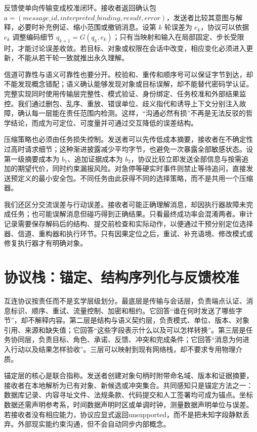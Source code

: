 反馈使单向传输变成校准闭环。接收者返回确认包 $a=(message\_id,interpreted\_binding,result,error)$，发送者比较其意图与解释，必要时补充例证、缩小范围或撤销消息。设第 $k$ 轮误差为 $e_k$，协议可以依据 $e_k$ 调整编码细节 $q_{k+1}=G(q_k,e_k)$；只有当映射和输入在局部固定、步长受限时，才能讨论误差收敛。若目标、对象或权限在会话中改变，相应变化必须进入更新，不能从若干轮一致就推出永久理解。

信道可靠性与语义可靠性也要分开。校验和、重传和顺序号可以保证字节到达，却不能发现概念错配；语义确认能够发现对象或目标误解，却不能替代密码学认证。完整实现同时使用传输层完整性、模式验证、身份绑定、任务校准和外部结果监控。我们通过删包、乱序、重放、错误单位、歧义指代和诱导上下文分别注入故障，确认每一层能在责任范围内检测。这样，“沟通必然有损”不再是无法反驳的哲学结论，而成为可定位、可度量并可通过交互降低的误差结构。

压缩策略也必须由任务损失控制。发送者可以先传低成本摘要，接收者在不确定性过高时请求细节；这种渐进披露减少平均字节，也避免一次暴露全部敏感状态。设第一级摘要成本为 $b_1$、追加证据成本为 $b_2$，协议比较立即发送全部信息与按需追加的期望代价，同时约束漏报风险。对急停等硬实时事件则禁止等待追问，直接发送预定义的最小安全包。不同任务由此获得不同的选择策略，而不是共用一个压缩器。

我们还区分交流误差与行动误差。接收者可能正确理解消息，却因执行器故障未完成任务；也可能误解消息但碰巧得到正确结果。只看最终成功率会混淆两者。审计记录需要保存解码后的结构、提交前检查和实际动作，以便通过干预分别定位选择器、信道、重构器和执行环节。只有因果定位之后，重试、补充语境、修改模式或修复执行器才有明确对象。

\section{协议栈：锚定、结构序列化与反馈校准}
\label{sec:protocol_stack}

互连协议按责任而不是玄学层级划分。最底层是传输与会话层，负责端点认证、消息标识、顺序、重试、流量控制、加密和租约。它回答“谁在何时发送了哪些字节”，却不解释内容。第二层是结构与语义契约层，负责模式、单位、版本、对象引用、来源和缺失值；它回答“这些字段表示什么以及可以怎样转换”。第三层是任务协同层，负责目标、角色、承诺、反馈、冲突和完成条件；它回答“消息为何进入行动以及结果怎样验收”。三层可以映射到现有网络栈，却不要求专用物理介质。

锚定层的核心是联合指称。发送者创建对象句柄时附带命名域、版本和证据摘要，接收者在本地解析为已有对象、新候选或冲突集合。共同感知只是锚定方法之一：数据库记录、内容寻址文件、法规条款、代码提交和人工签署均可成为锚点。坐标数据还需声明参考系，时间数据声明时区或单调时钟，测量数据声明单位与误差。若接收者没有相应能力，协议应显式返回unsupported，而不是把未知字段静默丢弃。外部现实能约束沟通，但不会自动同步内部概念。

